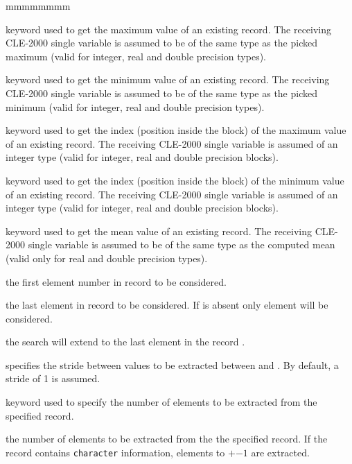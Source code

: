 \begin{ListeDeDescription}{mmmmmmmm}
\item[\moc{MAXVAL}] keyword used to get the maximum value of an existing
record. The receiving CLE-2000 single variable is assumed to be of the same type
as the  picked maximum (valid for integer, real and double precision types).

\item[\moc{MINVAL}] keyword used to get the minimum value of an existing
record.
The receiving CLE-2000 single variable is assumed to be of the same type as the
picked minimum (valid for integer, real and double precision types).

\item[\moc{INDMAX}] keyword used to get the index (position inside the block)
of the maximum value of an existing
record.
The receiving CLE-2000 single variable is assumed of an integer type
(valid for integer, real and double precision blocks).

\item[\moc{INDMIN}] keyword used to get the index (position inside the block)
of the minimum value of an existing
record.
The receiving CLE-2000 single variable is assumed of an integer type
(valid for integer, real and double precision blocks).

\item[\moc{MEAN}] keyword used to get the mean value of an existing
record.
The receiving CLE-2000 single variable is assumed to be of the same type as the
computed mean (valid only for real and double precision types).

\item[\dusa{index1}] the first element number in record  to be
considered.

\item[\dusa{index2}] the last element in record  to be
considered. If  is absent only element  will be
considered.

\item[\moc{*}] the search will extend to the last
element in the record .

\item[\dusa{index3}] specifies the stride between
values to be extracted between  and . By default, a
stride of 1 is assumed.

\item[\moc{NVAL}] keyword used to specify the number of elements to be
extracted from the specified record.

\item[\dusa{neval}] the number of  elements to be extracted from
the the specified record. If the record contains {\tt character}
information, elements
 to
$+$$-1$ are extracted.

\end{ListeDeDescription}

